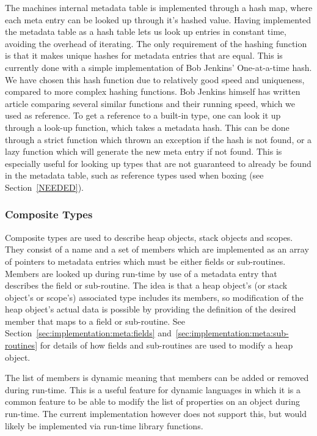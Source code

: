 The machines internal metadata table is implemented through a hash map, where
each meta entry can be looked up through it's hashed value. Having implemented
the metadata table as a hash table lets us look up entries in constant time,
avoiding the overhead of iterating. The only requirement of the hashing function
is that it makes unique hashes for metadata entries that are equal. This is
currently done with a simple implementation of Bob Jenkins' One-at-a-time
hash\cite{jenkins}. We have chosen this hash function due to relatively good
speed and uniqueness, compared to more complex hashing functions. Bob Jenkins
himself has written article comparing several similar functions and their
running speed, which we used as reference\cite{jenkins}. To get a reference to a
built-in type, one can look it up through a look-up function, which takes a
metadata hash. This can be done through a strict function which thrown an
exception if the hash is not found, or a lazy function which will generate the
new meta entry if not found. This is especially useful for looking up types that
are not guaranteed to already be found in the metadata table, such as reference
types used when boxing (see Section~\ref{NEEDED}).


\subsubsection{Composite Types}

Composite types are used to describe heap objects, stack objects and
scopes. They consist of a name and a set of members which are implemented as an
array of pointers to metadata entries which must be either fields or
sub-routines. Members are looked up during run-time by use of a metadata entry
that describes the field or sub-routine. The idea is that a heap object's (or
stack object's or scope's) associated type includes its members, so modification
of the heap object's actual data is possible by providing the definition of the
desired member that maps to a field or sub-routine. See
Section~\ref{sec:implementation:meta:fields}
and~\ref{sec:implementation:meta:sub-routines} for details of how fields and
sub-routines are used to modify a heap object.

The list of members is dynamic meaning that members can be added or removed
during run-time. This is a useful feature for dynamic languages in which it is a
common feature to be able to modify the list of properties on an object during
run-time. The current implementation however does not support this, but would
likely be implemented via run-time library functions.


